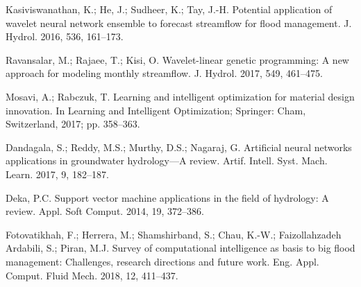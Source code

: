 \documentclass[12pt, a4paper]{report}
\begin{document}
\begin{thebibliography}{widest entry}
Kasiviswanathan, K.; He, J.; Sudheer, K.; Tay, J.-H. Potential application of wavelet neural network ensemble to forecast streamflow for flood management. J. Hydrol. 2016, 536, 161–173.

Ravansalar, M.; Rajaee, T.; Kisi, O. Wavelet-linear genetic programming: A new approach for modeling monthly streamflow. J. Hydrol. 2017, 549, 461–475.

Mosavi, A.; Rabczuk, T. Learning and intelligent optimization for material design innovation. In Learning and Intelligent Optimization; Springer: Cham, Switzerland, 2017; pp. 358–363.

Dandagala, S.; Reddy, M.S.; Murthy, D.S.; Nagaraj, G. Artificial neural networks applications in groundwater hydrology—A review. Artif. Intell. Syst. Mach. Learn. 2017, 9, 182–187.

Deka, P.C. Support vector machine applications in the field of hydrology: A review. Appl. Soft Comput. 2014,
19, 372–386.

Fotovatikhah, F.; Herrera, M.; Shamshirband, S.; Chau, K.-W.; Faizollahzadeh Ardabili, S.; Piran, M.J. Survey of computational intelligence as basis to big flood management: Challenges, research directions and future work. Eng. Appl. Comput. Fluid Mech. 2018, 12, 411–437. 

\end{thebibliography}






\end{document}
